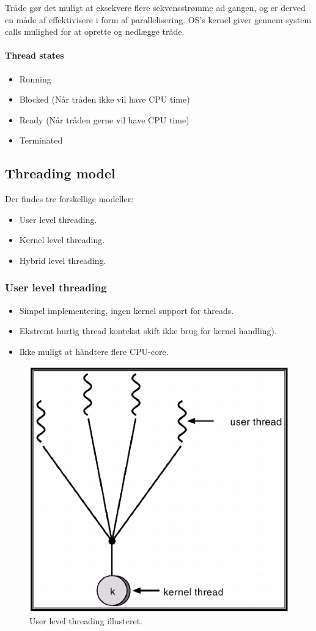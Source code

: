 Tråde gør det muligt at eksekvere flere sekvensstrømme ad gangen, og er derved en måde af effektivisere i form af parallelisering. OS's kernel giver gennem system calls mulighed for at oprette og nedlægge tråde.

\paragraph{Thread states}
\begin{itemize}
	\item Running
	\item Blocked (Når tråden ikke vil have CPU time)
	\item Ready (Når tråden gerne vil have CPU time)
	\item Terminated
\end{itemize}


\subsection{Threading model}
Der findes tre forskellige modeller:

\begin{itemize}
	\item User level threading.
	\item Kernel level threading.
	\item Hybrid level threading.
\end{itemize}

\subsubsection{User level threading}
\begin{itemize}
	\item Simpel implementering, ingen kernel support for threads.
	\item Ekstremt hurtig thread kontekst skift ikke brug for kernel handling).
	\item Ikke muligt at håndtere flere CPU-core.
\end{itemize}

\begin{figure}[H]
	\centering
	\includegraphics[width=0.5\linewidth]{figs/spm1/userthreads}
	\caption{User level threading illusteret.}
	\label{fig:userthreads}
\end{figure}

